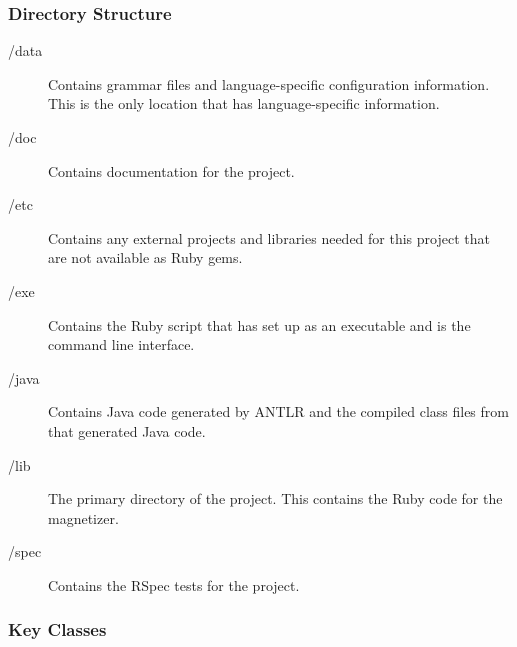 \documentclass[letter,10pt,final]{article}
\begin{document}
\subsubsection{Directory Structure}
\begin{description}
 \item [/data]
    Contains grammar files and language-specific 
configuration information. This is the only location that has 
language-specific information.

 \item [/doc]
    Contains documentation for the project.
    
 \item [/etc]
    Contains any external projects and libraries needed for this 
project that are not available as Ruby gems.

 \item [/exe]
    Contains the Ruby script that has set up as an 
executable and is the command line interface.

 \item [/java]
    Contains Java code generated by ANTLR and the compiled class files 
from that generated Java code.

 \item [/lib]
    The primary directory of the project. This contains the Ruby code 
for the magnetizer.

 \item [/spec]
    Contains the RSpec tests for the project. 

\end{description}


\subsubsection{Key Classes}
\end{document}
